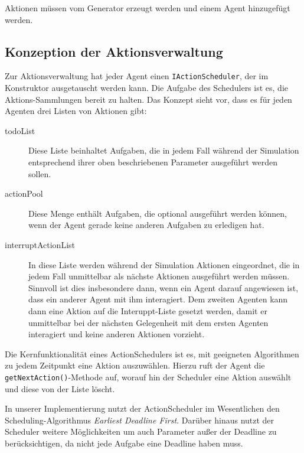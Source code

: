 Aktionen müssen vom Generator erzeugt werden und einem Agent hinzugefügt werden.

\subsection{Konzeption der Aktionsverwaltung}\label{subsec:concept_actionhandling}
Zur Aktionsverwaltung hat jeder Agent einen \texttt{IActionScheduler}, der im Konstruktor ausgetauscht werden kann. Die Aufgabe des Schedulers ist es, die Aktions-Sammlungen bereit zu halten. Das Konzept sieht vor, dass es für jeden Agenten drei Listen von Aktionen gibt:
\begin{description}
	\item[todoList] Diese Liste beinhaltet Aufgaben, die in jedem Fall während der Simulation entsprechend ihrer oben beschriebenen Parameter ausgeführt werden sollen.
	\item[actionPool] Diese Menge enthält Aufgaben, die optional ausgeführt werden können, wenn der Agent gerade keine anderen Aufgaben zu erledigen hat.
	\item[interruptActionList] In diese Liste werden während der Simulation Aktionen eingeordnet, die in jedem Fall unmittelbar als nächste Aktionen ausgeführt werden müssen. Sinnvoll ist dies insbesondere dann, wenn ein Agent darauf angewiesen ist, dass ein anderer Agent mit ihm interagiert. Dem zweiten Agenten kann dann eine Aktion auf die Interuppt-Liste gesetzt werden, damit er unmittelbar bei der nächsten Gelegenheit mit dem ersten Agenten interagiert und keine anderen Aktionen vorzieht.
\end{description}

Die Kernfunktionalität eines ActionSchedulers ist es, mit geeigneten Algorithmen zu jedem Zeitpunkt eine Aktion auszuwählen. Hierzu ruft der Agent die \texttt{getNextAction()}-Methode auf, worauf hin der Scheduler eine Aktion auswählt und diese von der Liste löscht.

In unserer Implementierung nutzt der ActionScheduler im Wesentlichen den Scheduling-Algorithmus \emph{Earliest Deadline First}. Darüber hinaus nutzt der Scheduler weitere Möglichkeiten um auch Parameter außer der Deadline zu berücksichtigen, da nicht jede Aufgabe eine Deadline haben muss.  


